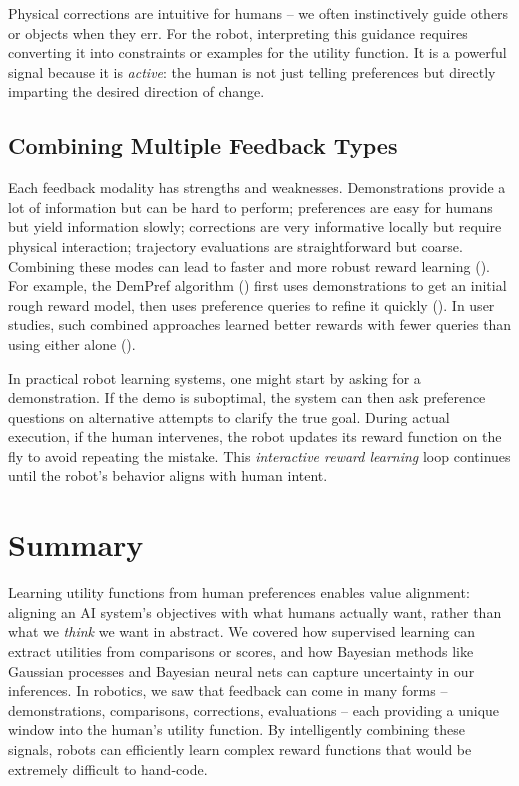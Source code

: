 \documentclass[
  letterpaper,
  numbers=noenddot,
  DIV=11]{scrreprt}
\theoremstyle{plain}
\theoremstyle{definition}
\theoremstyle{remark}
\begin{document}
Physical corrections are intuitive for humans -- we often instinctively
guide others or objects when they err. For the robot, interpreting this
guidance requires converting it into constraints or examples for the
utility function. It is a powerful signal because it is \emph{active}:
the human is not just telling preferences but directly imparting the
desired direction of change.

\subsection*{Combining Multiple Feedback
Types}\label{combining-multiple-feedback-types}

Each feedback modality has strengths and weaknesses. Demonstrations
provide a lot of information but can be hard to perform; preferences are
easy for humans but yield information slowly; corrections are very
informative locally but require physical interaction; trajectory
evaluations are straightforward but coarse. Combining these modes can
lead to faster and more robust reward learning
(). For
example, the DemPref algorithm
() first
uses demonstrations to get an initial rough reward model, then uses
preference queries to refine it quickly
(). In user
studies, such combined approaches learned better rewards with fewer
queries than using either alone
().

In practical robot learning systems, one might start by asking for a
demonstration. If the demo is suboptimal, the system can then ask
preference questions on alternative attempts to clarify the true goal.
During actual execution, if the human intervenes, the robot updates its
reward function on the fly to avoid repeating the mistake. This
\emph{interactive reward learning} loop continues until the robot's
behavior aligns with human intent.

\section{Summary}\label{summary}

Learning utility functions from human preferences enables value
alignment: aligning an AI system's objectives with what humans actually
want, rather than what we \emph{think} we want in abstract. We covered
how supervised learning can extract utilities from comparisons or
scores, and how Bayesian methods like Gaussian processes and Bayesian
neural nets can capture uncertainty in our inferences. In robotics, we
saw that feedback can come in many forms -- demonstrations, comparisons,
corrections, evaluations -- each providing a unique window into the
human's utility function. By intelligently combining these signals,
robots can efficiently learn complex reward functions that would be
extremely difficult to hand-code.
\end{document}
